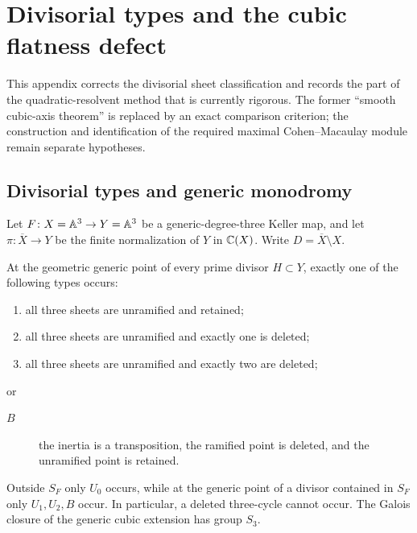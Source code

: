 \section{Divisorial types and the cubic flatness defect}
\label{app:cubic-normalization-defect}

This appendix corrects the divisorial sheet classification and records the
part of the quadratic-resolvent method that is currently rigorous.  The former
``smooth cubic-axis theorem'' is replaced by an exact comparison criterion;
the construction and identification of the required maximal
Cohen--Macaulay module remain separate hypotheses.

\subsection{Divisorial types and generic monodromy}

Let \(F\colon X=\mathbb A^3\to Y=\mathbb A^3\) be a generic-degree-three Keller map, and
let \(\pi\colon\overline X\to Y\) be the finite normalization of \(Y\) in
\(\mathbb C(X)\).  Write \(D=\overline X\setminus X\).

\begin{proposition}
\label{prop:cubic-divisorial-trichotomy}
\label{prop:corrected-divisorial-types}
At the geometric generic point of every prime divisor \(H\subset Y\), exactly
one of the following types occurs:
\begin{enumerate}[label=\(U_\arabic*\),start=0]
\item all three sheets are unramified and retained;
\item all three sheets are unramified and exactly one is deleted;
\item all three sheets are unramified and exactly two are deleted;
\end{enumerate}
or
\begin{description}
\item[\(B\)] the inertia is a transposition, the ramified point is deleted,
and the unramified point is retained.
\end{description}
Outside \(S_F\) only \(U_0\) occurs, while at the generic point of a divisor
contained in \(S_F\) only \(U_1,U_2,B\) occur.  In particular, a deleted
three-cycle cannot occur.  The Galois closure of the generic cubic extension
has group \(S_3\).
\end{proposition}

